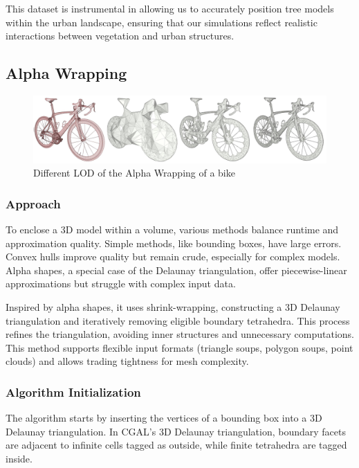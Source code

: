 \documentclass[12pt]{article}
\begin{document}
This dataset is instrumental in allowing us to accurately position tree models
within the urban landscape, ensuring that our simulations reflect realistic
interactions between vegetation and urban structures.


\subsection{Alpha Wrapping}
\label{sec:alpha_wrapping}
\begin{figure}[H]
    \centering
        \centering
        \includegraphics[width=\textwidth]{images/alpha-wrapping-bike.jpg}
        \caption{Different LOD of the Alpha Wrapping of a bike}
\end{figure}

\subsubsection{Approach}
To enclose a 3D model within a volume, various methods balance runtime and
approximation quality. Simple methods, like bounding boxes, have large errors.
Convex hulls improve quality but remain crude, especially for complex models.
Alpha shapes, a special case of the Delaunay triangulation, offer piecewise-linear
approximations but struggle with complex input data.

Inspired by alpha shapes, it uses shrink-wrapping, constructing a 3D Delaunay
triangulation and iteratively removing eligible boundary tetrahedra. This process
refines the triangulation, avoiding inner structures and unnecessary
computations. This method supports flexible input formats (triangle soups,
polygon soups, point clouds) and allows trading tightness for mesh complexity.

\subsubsection{Algorithm Initialization}
The algorithm starts by inserting the vertices of a bounding box into a 3D
Delaunay triangulation. In CGAL's 3D Delaunay triangulation, boundary facets
are adjacent to infinite cells tagged as outside, while finite tetrahedra are
tagged inside.
\end{document}
